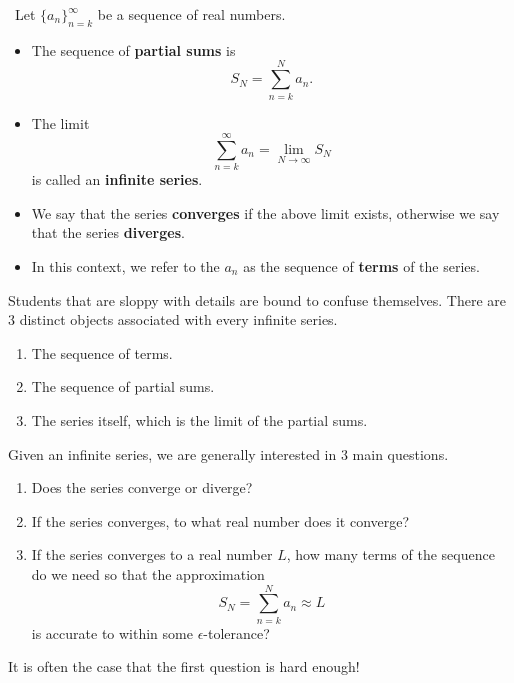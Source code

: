 

\begin{definition}\,
Let $\{a_n\}_{n=k}^\infty$ be a sequence of real numbers.
\begin{itemize}
\item The sequence of \textbf{partial sums} is 
\begin{equation*}
S_N = \sum_{n=k}^Na_n.
\end{equation*}
\item The limit 
\begin{equation*}
\sum_{n=k}^\infty a_n = \lim_{N\to\infty}S_N
\end{equation*}
is called an \textbf{infinite series}.
\item We say that the series \textbf{converges} if the above limit exists, otherwise we say that the series \textbf{diverges}.
\item In this context, we refer to the $a_n$ as the sequence of \textbf{terms} of the series.
\end{itemize}
\end{definition}

\vfill

\begin{remark}[Caution]
Students that are sloppy with details are bound to confuse themselves.
There are 3 distinct objects associated with every infinite series.
\begin{enumerate}
\item The sequence of terms.
\item The sequence of partial sums.
\item The series itself, which is the limit of the partial sums.
\end{enumerate}
\end{remark}

\vfill

\begin{remark}
Given an infinite series, we are generally interested in 3 main questions.
\begin{enumerate}
\item Does the series converge or diverge?  
\item If the series converges, to what real number does it converge?
\item If the series converges to a real number $L$, how many terms of the sequence do we need so that the approximation
\begin{equation*}
S_N = \sum_{n=k}^N a_n \approx L
\end{equation*}
is accurate to within some $\epsilon$-tolerance?
\end{enumerate}
It is often the case that the first question is hard enough!
\end{remark}

